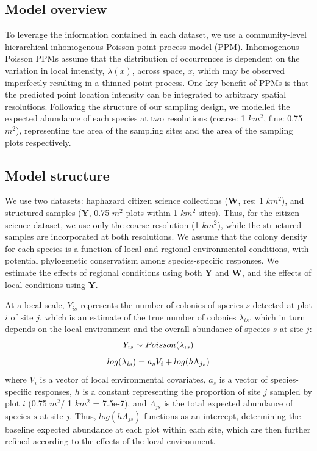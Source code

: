 \documentclass[preprint,review,times,12pt]{elsarticle}
\begin{document}
\subsection{Model overview}
To leverage the information contained in each dataset, we use a community-level hierarchical inhomogenous Poisson point process model (PPM). Inhomogenous Poisson PPMs assume that the distribution of occurrences is dependent on the variation in local intensity, $\lambda(x)$, across space, $x$, which may be observed imperfectly resulting in a thinned point process. One key benefit of PPMs is that the predicted point location intensity can be integrated to arbitrary spatial resolutions. Following the structure of our sampling design, we modelled the expected abundance of each species at two resolutions (coarse: 1 $km^2$, fine: 0.75 $m^2$), representing the area of the sampling sites and the area of the sampling plots respectively.


\subsection{Model structure}
We use two datasets: haphazard citizen science collections ($\textbf{W}$, res: 1 $km^2$), and structured samples ($\textbf{Y}$, 0.75 $m^2$ plots within 1 $km^2$ sites). Thus, for the citizen science dataset, we use only the coarse resolution (1 $km^2$), while the structured samples are incorporated at both resolutions. We assume that the colony density for each species is a function of local and regional environmental conditions, with potential phylogenetic conservatism among species-specific responses. We estimate the effects of regional conditions using both $\textbf{Y}$ and $\textbf{W}$, and the effects of local conditions using $\textbf{Y}$.

At a local scale, $Y_{is}$ represents the number of colonies of species $s$ detected at plot $i$ of site $j$, which is an estimate of the true number of colonies $\lambda_{is}$, which in turn depends on the local environment and the overall abundance of species $s$ at site $j$:
\begin{equation}
Y_{is} \sim Poisson(\lambda_{is}) \\
\end{equation}
\begin{equation}
log(\lambda_{is}) = a_s V_i + log(h\Lambda_{js}) \\
\end{equation}
where $V_i$ is a vector of local environmental covariates, $a_s$ is a vector of species-specific responses, $h$ is a constant representing the proportion of site $j$ sampled by plot $i$ (0.75 $m^2 /$ 1 $km^2$ = 7.5e-7), and $\Lambda_{js}$ is the total expected abundance of species $s$ at site $j$. Thus, $log(h\Lambda_{js})$ functions as an intercept, determining the baseline expected abundance at each plot within each site, which are then further refined according to the effects of the local environment.
\end{document}
